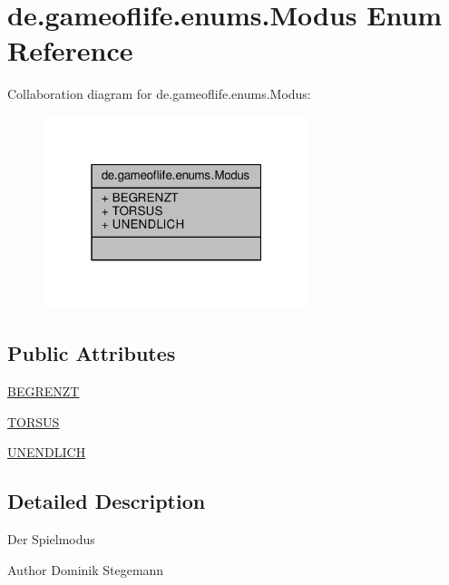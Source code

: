 \hypertarget{enumde_1_1gameoflife_1_1enums_1_1Modus}{\section{de.\-gameoflife.\-enums.\-Modus Enum Reference}
\label{enumde_1_1gameoflife_1_1enums_1_1Modus}
}


Collaboration diagram for de.\-gameoflife.\-enums.\-Modus\-:\nopagebreak
\begin{figure}[H]
\begin{center}
\leavevmode
\includegraphics[width=220pt]{enumde_1_1gameoflife_1_1enums_1_1Modus__coll__graph}
\end{center}
\end{figure}
\subsection*{Public Attributes}
\begin{DoxyCompactItemize}
\item 
\hyperlink{enumde_1_1gameoflife_1_1enums_1_1Modus_ab86143d65d3407a6683dcf43b4091ca7}{B\-E\-G\-R\-E\-N\-Z\-T}
\item 
\hyperlink{enumde_1_1gameoflife_1_1enums_1_1Modus_ac51fa8c0735f22bf9b5a995f04f30242}{T\-O\-R\-S\-U\-S}
\item 
\hyperlink{enumde_1_1gameoflife_1_1enums_1_1Modus_a12c2cd3fc19da83d151fa6a7ed06cbd2}{U\-N\-E\-N\-D\-L\-I\-C\-H}
\end{DoxyCompactItemize}


\subsection{Detailed Description}
Der Spielmodus \begin{DoxyAuthor}{Author}
Dominik Stegemann 
\end{DoxyAuthor}


